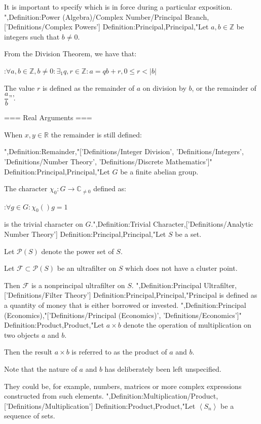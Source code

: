 It is important to specify which is in force during a particular exposition.
",Definition:Power (Algebra)/Complex Number/Principal Branch,['Definitions/Complex Powers']
Definition:Principal,Principal,"Let $a, b \in \mathbb Z$ be integers such that $b \ne 0$.

From the Division Theorem, we have that:

:$\forall a, b \in \mathbb Z, b \ne 0: \exists_1 q, r \in \mathbb Z: a = q b + r, 0 \le r < \left\lvert b \right\rvert$


The value $r$ is defined as the remainder of $a$ on division by $b$, or the remainder of $\dfrac a b$'''.


=== Real Arguments ===

When $x, y \in \mathbb R$ the remainder is still defined:

",Definition:Remainder,"['Definitions/Integer Division', 'Definitions/Integers', 'Definitions/Number Theory', 'Definitions/Discrete Mathematics']"
Definition:Principal,Principal,"Let $G$ be a finite abelian group.

The character $\chi_0: G \to \mathbb C_{\ne 0}$ defined as:

:$\forall g \in G: \chi_0 \left(   \right)g = 1$

is the trivial character on $G$.",Definition:Trivial Character,['Definitions/Analytic Number Theory']
Definition:Principal,Principal,"Let $S$ be a set.

Let $\mathcal P \left( S \right)$ denote the power set of $S$.


Let $\mathcal F \subset \mathcal P \left( S \right)$ be an ultrafilter on $S$ which does not have a cluster point.

Then $\mathcal F$ is a nonprincipal ultrafilter  on $S$.
",Definition:Principal Ultrafilter,['Definitions/Filter Theory']
Definition:Principal,Principal,"Principal is defined as a quantity of money that is either borrowed or invested.
",Definition:Principal (Economics),"['Definitions/Principal (Economics)', 'Definitions/Economics']"
Definition:Product,Product,"Let $a \times b$ denote the operation of multiplication on two objects $a$ and $b$.

Then the result $a \times b$ is referred to as the product of $a$ and $b$.


Note that the nature of $a$ and $b$ has deliberately been left unspecified.

They could be, for example, numbers, matrices or more complex expressions constructed from such elements.
",Definition:Multiplication/Product,['Definitions/Multiplication']
Definition:Product,Product,"Let $\left\langle S_n \right\rangle$ be a sequence of sets. 

